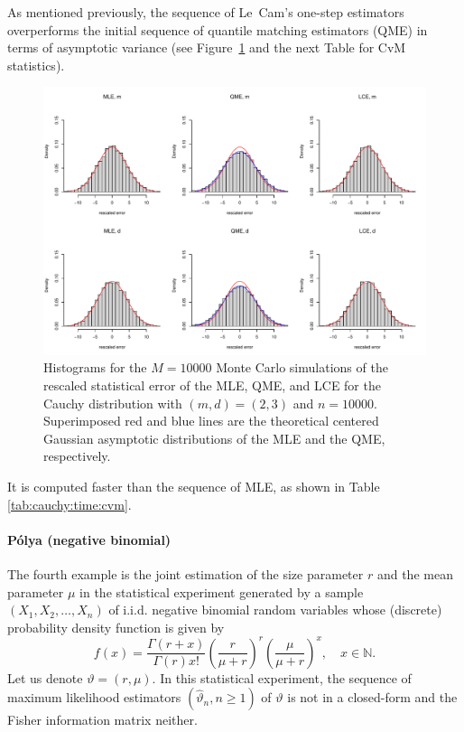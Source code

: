As mentioned previously, the sequence of Le~Cam's one-step estimators overperforms the initial sequence of quantile matching estimators (QME) in terms of asymptotic variance (see Figure~\ref{fig:cauchy} and the next Table for CvM statistics). 

\begin{figure}[ht]
\centering
\includegraphics[width=\textwidth]{fig-Cauchy.pdf}
\caption{Histograms for the $M=10000$ Monte Carlo simulations of the rescaled statistical error of the MLE, QME, and LCE for the Cauchy distribution with $(m,d)=(2,3)$ and $n=10000$. Superimposed red and blue lines are the theoretical centered Gaussian asymptotic distributions of the MLE and the QME, respectively.}\label{fig:cauchy}
\end{figure}

It is computed faster than the sequence of MLE, as shown in Table \ref{tab:cauchy:time:cvm}.





\paragraph{P\'olya (negative binomial)}

The fourth example is the joint estimation of the size parameter $r$ and the mean parameter $\mu$ in the statistical experiment generated by a sample $(X_1,X_2,\ldots,X_n)$ of i.i.d. negative binomial random variables whose (discrete) probability density function is given by
$$ f(x)= \frac{\Gamma(r+x)}{\Gamma(r)x!} \left( \frac{r}{\mu+r} \right)^{r} \left(\frac{\mu}{\mu+r} \right)^{x}, \quad x \in \mathbb{N}.$$
Let us denote $\vartheta=(r,\mu)$. In this statistical experiment, the sequence of maximum likelihood estimators $(\widehat{\vartheta}_n, n \geq 1)$ of $\vartheta$ is not in a closed-form and the Fisher information matrix neither.

